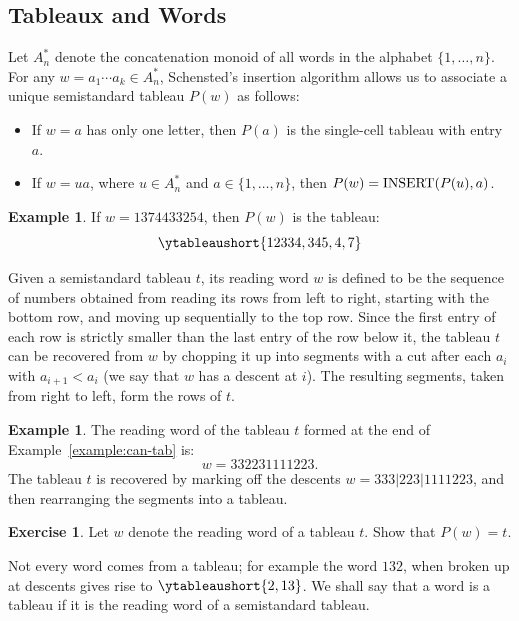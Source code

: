 \documentclass[11pt]{amsart}
\theoremstyle{definition}
\theoremstyle{example}
\newtheorem{example}[theorem]{Example}
\newtheorem{exercise}[theorem]{Exercise}
\newcommand{\ins}{\textup{INSERT}}
\begin{document}
\subsection{Tableaux and Words}
\label{sec:tabl-assoc-word}
Let $A^*_n$ denote the concatenation monoid of all words in the alphabet $\{1,\dotsc,n\}$.
For any $w=a_1\dotsb a_k\in A^*_n$, Schensted's insertion algorithm allows us to associate a unique semistandard tableau $P(w)$ as follows:
\begin{itemize}
\item If $w=a$ has only one letter, then $P(a)$ is the single-cell tableau with entry $a$.
\item If $w=ua$, where $u\in A_n^*$ and $a\in \{1,\dotsc,n\}$, then \linebreak $P(w)=\ins(P(u), a)$.
\end{itemize}
\begin{example}
  If $w=1374433254$, then $P(w)$ is the tableau:
  \begin{displaymath}
    \ytableaushort{12334,345,4,7}
  \end{displaymath}
\end{example}
\label{sec:tableau-as-words}
Given a semistandard tableau $t$, its reading word $w$ is defined to be the sequence of numbers obtained from reading its rows from left to right, starting with the bottom row, and moving up sequentially to the top row.
Since the first entry of each row is strictly smaller than the last entry of the row below it, the tableau $t$ can be recovered from $w$ by chopping it up into segments with a cut after each $a_i$ with $a_{i+1}<a_i$ (we say that $w$ has a descent at $i$). The resulting segments, taken from right to left, form the rows of $t$.
\begin{example}
  The reading word of the tableau $t$ formed at the end of Example~\ref{example:can-tab} is:
  \begin{displaymath}
    w = 332231111223.
  \end{displaymath}
  The tableau $t$ is recovered by marking off the descents $w = 333|223|1111223$, and then rearranging the segments into a tableau.
\end{example}
\begin{exercise}
  \label{exercise:tableau-word}
  Let $w$ denote the reading word of a tableau $t$.
  Show that $P(w)=t$.
\end{exercise}
Not every word comes from a tableau; for example the word $132$, when broken up at descents gives rise to $\ytableaushort{2,13}$.
We shall say that a word is a tableau if it is the reading word of a semistandard tableau.
\end{document}
